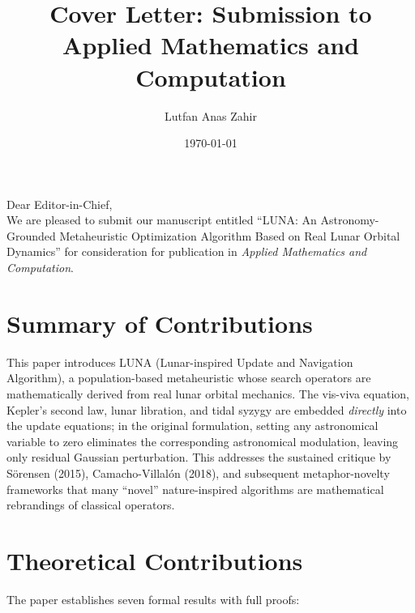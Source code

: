 \documentclass[11pt,a4paper]{article}
\title{Cover Letter: Submission to Applied Mathematics and Computation}
\author{Lutfan Anas Zahir}
\date{\today}
\begin{document}
\maketitle

\noindent Dear Editor-in-Chief,\\

We are pleased to submit our manuscript entitled ``LUNA: An Astronomy-Grounded Metaheuristic Optimization Algorithm Based on Real Lunar Orbital Dynamics'' for consideration for publication in \textit{Applied Mathematics and Computation}.

\section*{Summary of Contributions}

This paper introduces LUNA (Lunar-inspired Update and Navigation Algorithm), a population-based metaheuristic whose search operators are mathematically derived from real lunar orbital mechanics. The vis-viva equation, Kepler's second law, lunar libration, and tidal syzygy are embedded \emph{directly} into the update equations; in the original formulation, setting any astronomical variable to zero eliminates the corresponding astronomical modulation, leaving only residual Gaussian perturbation. This addresses the sustained critique by S\"orensen (2015), Camacho-Villal\'on (2018), and subsequent metaphor-novelty frameworks that many ``novel'' nature-inspired algorithms are mathematical rebrandings of classical operators.

\section*{Theoretical Contributions}

The paper establishes seven formal results with full proofs:
\end{document}
